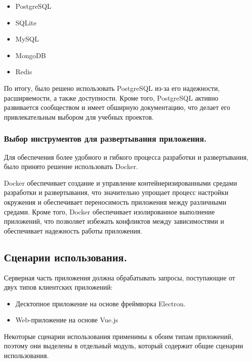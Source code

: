 \documentclass[12pt, russian]{extarticle}
\begin{document}
\begin{spacing}{1.5}
    \begin{itemize}
        \item PostgreSQL
        \item SQLite
        \item MySQL
        \item MongoDB
        \item Redis
    \end{itemize}

    По итогу, было решено использовать PostgreSQL из-за его надежности, расширяемости, а также доступности.
    Кроме того, PostgreSQL активно развивается сообществом и имеет обширную документацию,
    что делает его привлекательным выбором для учебных проектов.

    \subsubsection{Выбор инструментов для развертывания приложения.}

    Для обеспечения более удобного и гибкого процесса разработки и развертывания,
    было принято решение использовать Docker.

    Docker обеспечивает создание и управление контейнеризированными средами разработки и развертывания,
    что значительно упрощает процесс настройки окружения и обеспечивает переносимость приложения между
    различными средами. Кроме того, Docker обеспечивает изолированное выполнение приложений,
    что позволяет избежать конфликтов между зависимостями и обеспечивает надежность работы приложения.

    \newpage
    \subsection{Сценарии использования.}

    Серверная часть приложения должна обрабатывать запросы, поступающие от двух типов клиентских приложений:

    \begin{itemize}
        \item Десктопное приложение на основе фреймворка Electron.
        \item Web-приложение на основе Vue.js
    \end{itemize}

    Некоторые сценарии использования применимы к обоим типам приложений, поэтому они выделены в отдельный
    модуль, который содержит общие сценарии использования.


\end{spacing}
\end{document}
